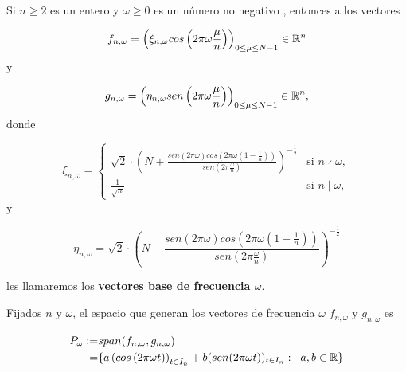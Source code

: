 \begin{defi}
Si $n \geq 2$ es un entero y $\omega \geq 0$ es un número no negativo
, entonces a los vectores

	\begin{equation}
	\label{eq5: 19Marzo}
	f_{n, \omega}= \left( \xi_{n, \omega} cos \left(2 \pi \omega \frac{\mu }{n} \right) \right)_{0 \leq \mu \leq N-1}
	\in \mathbb{R}^{n}
	\end{equation}
y 

	\begin{equation}
	\label{eq6: 19Marzo}
	g_{n, \omega}= \left( \eta_{n, \omega} sen \left(2 \pi \omega \frac{\mu }{n}\right) \right)_{0 \leq \mu \leq N-1}
	\in \mathbb{R}^{n},
	\end{equation}
donde

\begin{equation}
\label{eq7: 19Marzo}
\xi_{n, \omega}= 
\left\{
	\begin{array}{ll}
		\sqrt{2} \cdot \left( N + \frac{sen(2 \pi \omega)
	cos(2 \pi \omega \left( 1- \frac{1}{n} \right))}{sen \left(2 \pi 
	\frac{\omega}{n} \right)} \right)^{-\frac{1}{2}}  & \mbox{si } n \nmid \omega,  \\
		\frac{1}{\sqrt{n}} & \mbox{si } n \mid \omega,
	\end{array}
\right.
\end{equation}
y

	\begin{equation}
	\label{eq8: 19Marzo}
	\eta_{n, \omega}= \sqrt{2} \cdot \left( N - \frac{sen(2 \pi \omega)
	cos(2 \pi \omega \left( 1- \frac{1}{n} \right))}{sen \left(2 \pi 
	\frac{\omega}{n} \right)} \right)^{-\frac{1}{2}}
	\end{equation}

\noindent	
les llamaremos los \textbf{vectores base de frecuencia $\omega$}.
\end{defi}

Fijados $n$ y $\omega$,
el espacio que generan los vectores de frecuencia $\omega$
$f_{n, \omega}$ y $g_{n, \omega}$ es

\begin{align}
\label{eq2: 20Marzo}
P_{\omega}:= & span(f_{n, \omega}, g_{n, \omega}) \\ 
= &
\{ a \left( cos \left(2 \pi \omega t \right) \right)_{t \in I_{n}} +
b ( sen (2 \pi \omega t ))_{t \in I_{n}} : 
\hspace{0.2cm} a, b \in \mathbb{R} \} \\ \nonumber
\end{align}

